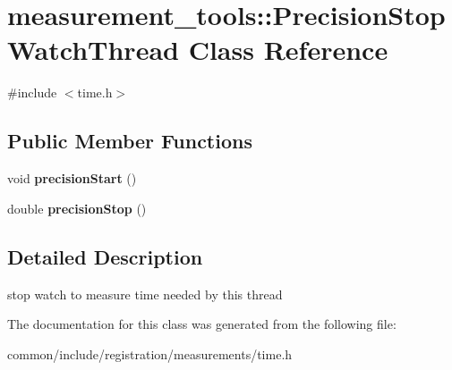 \hypertarget{classmeasurement__tools_1_1PrecisionStopWatchThread}{
\section{measurement\_\-tools::PrecisionStopWatchThread Class Reference}
\label{classmeasurement__tools_1_1PrecisionStopWatchThread}
}


{\ttfamily \#include $<$time.h$>$}

\subsection*{Public Member Functions}
\begin{DoxyCompactItemize}
\item 
\hypertarget{classmeasurement__tools_1_1PrecisionStopWatchThread_a0269d78125a6eb7f73942c8b391344c6}{
void {\bfseries precisionStart} ()}
\label{classmeasurement__tools_1_1PrecisionStopWatchThread_a0269d78125a6eb7f73942c8b391344c6}

\item 
\hypertarget{classmeasurement__tools_1_1PrecisionStopWatchThread_ad2f9a8faf4bb83a64535ebce7c8dad6e}{
double {\bfseries precisionStop} ()}
\label{classmeasurement__tools_1_1PrecisionStopWatchThread_ad2f9a8faf4bb83a64535ebce7c8dad6e}

\end{DoxyCompactItemize}


\subsection{Detailed Description}
stop watch to measure time needed by this thread 

The documentation for this class was generated from the following file:\begin{DoxyCompactItemize}
\item 
common/include/registration/measurements/time.h\end{DoxyCompactItemize}
